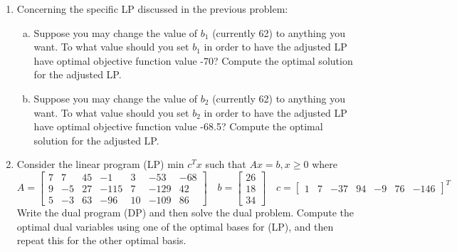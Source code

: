 \documentclass{article}
\begin{document}
\begin{enumerate}
	\item Concerning the specific LP discussed in the previous problem:

		\begin{enumerate}[a)]
			\item Suppose you may change the value of $b_1$ (currently 62) to anything you want. To what value should you set $b_1$ in order to have the adjusted LP have optimal objective function value -70? Compute the optimal solution for the adjusted LP.

			\item Suppose you may change the value of $b_2$ (currently 62) to anything you want. To what value should you set $b_2$ in order to have the adjusted LP have optimal objective function value -68.5? Compute the optimal solution for the adjusted LP.
				
		\end{enumerate}

	\item Consider the linear program (LP) min $c^T x$ such that $Ax=b, x\ge 0$ where \[ A=\begin{bmatrix}
				7 & 7 & 45 & -1 & 3 & -53 & -68 \\
				9 & -5 & 27 & -115 & 7 & -129 & 42 \\
				5 & -3 & 63 & -96 & 10 & -109 & 86
			\end{bmatrix}\quad b=\begin{bmatrix}
				26 \\ 18 \\ 34
			\end{bmatrix}\quad c=\begin{bmatrix}
				1 & 7 & -37 & 94 & -9 & 76 & -146
		\end{bmatrix}^T\] Write the dual program (DP) and then solve the dual problem. Compute the optimal dual variables using one of the optimal bases for (LP), and then repeat this for the other optimal basis.

\end{enumerate}
\end{document}
